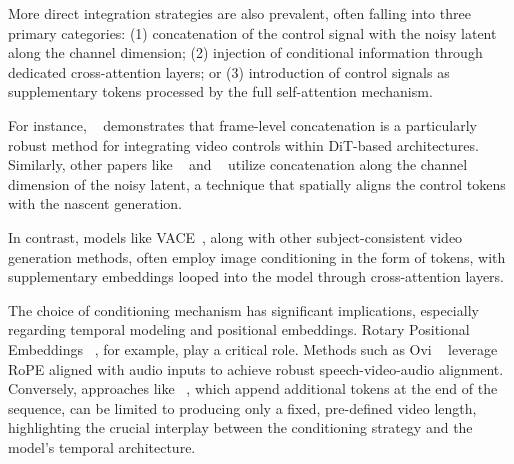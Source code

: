 More direct integration strategies are also prevalent, often falling into three primary categories: (1) concatenation of the control signal with the noisy latent along the channel dimension; (2) injection of conditional information through dedicated cross-attention layers; or (3) introduction of control signals as supplementary tokens processed by the full self-attention mechanism.

For instance, \recammaster{}~\cite{bai2025recammaster} demonstrates that frame-level concatenation is a particularly robust method for integrating video controls within DiT-based architectures. Similarly, other papers like \trajectorycrafter{}~\cite{yu2025trajectorycrafter} and \exfd{}~\cite{ex4d} utilize concatenation along the channel dimension of the noisy latent, a technique that spatially aligns the control tokens with the nascent generation.

In contrast, models like VACE~\cite{jiang2025vace}, along with other subject-consistent video generation methods, often employ image conditioning in the form of tokens, with supplementary embeddings looped into the model through cross-attention layers.

The choice of conditioning mechanism has significant implications, especially regarding temporal modeling and positional embeddings. Rotary Positional Embeddings ~\cite{su2024roformer}, for example, play a critical role. Methods such as Ovi ~\cite{low2025ovi} leverage RoPE aligned with audio inputs to achieve robust speech-video-audio alignment. Conversely, approaches like \recammaster{}~\cite{bai2025recammaster}, which append additional tokens at the end of the sequence, can be limited to producing only a fixed, pre-defined video length, highlighting the crucial interplay between the conditioning strategy and the model's temporal architecture.


